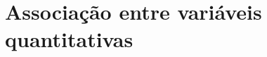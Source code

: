 \documentclass[9pt]{beamer}
\begin{document}
%
%	
%	
%	
%	
%
%

\section{Associação entre variáveis quantitativas}
\end{document}
